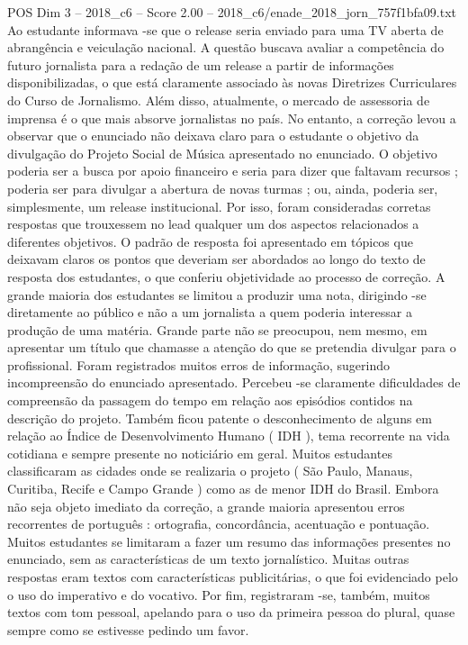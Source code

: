 \begin{textsample}{POS Dim 3 – 2018\_c6 – Score 2.00 – 2018\_c6/enade\_2018\_jorn\_757f1bfa09.txt}
Ao estudante informava -se que o release seria enviado para uma TV aberta de abrangência e veiculação nacional.
A questão buscava avaliar a competência do futuro jornalista para a redação de um release a partir de informações disponibilizadas, o que está claramente associado às novas Diretrizes Curriculares do Curso de Jornalismo.
Além disso, atualmente, o mercado de assessoria de imprensa é o que mais absorve jornalistas no país.
No entanto, a correção levou a observar que o enunciado não deixava claro para o estudante o objetivo da divulgação do Projeto Social de Música apresentado no enunciado.
O objetivo poderia ser a busca por apoio financeiro e seria para dizer que faltavam recursos ; poderia ser para divulgar a abertura de novas turmas ; ou, ainda, poderia ser, simplesmente, um release institucional.
Por isso, foram consideradas corretas respostas que trouxessem no lead qualquer um dos aspectos relacionados a diferentes objetivos.
O padrão de resposta foi apresentado em tópicos que deixavam claros os pontos que deveriam ser abordados ao longo do texto de resposta dos estudantes, o que conferiu objetividade ao processo de correção.
A grande maioria dos estudantes se limitou a produzir uma nota, dirigindo -se diretamente ao público e não a um jornalista a quem poderia interessar a produção de uma matéria.
Grande parte não se preocupou, nem mesmo, em apresentar um título que chamasse a atenção do que se pretendia divulgar para o profissional.
Foram registrados muitos erros de informação, sugerindo incompreensão do enunciado apresentado.
Percebeu -se claramente dificuldades de compreensão da passagem do tempo em relação aos episódios contidos na descrição do projeto.
Também ficou patente o desconhecimento de alguns em relação ao Índice de Desenvolvimento Humano ( IDH ), tema recorrente na vida cotidiana e sempre presente no noticiário em geral.
Muitos estudantes classificaram as cidades onde se realizaria o projeto ( São Paulo, Manaus, Curitiba, Recife e Campo Grande ) como as de menor IDH do Brasil.
Embora não seja objeto imediato da correção, a grande maioria apresentou erros recorrentes de português : ortografia, concordância, acentuação e pontuação.
Muitos estudantes se limitaram a fazer um resumo das informações presentes no enunciado, sem as características de um texto jornalístico.
Muitas outras respostas eram textos com características publicitárias, o que foi evidenciado pelo o uso do imperativo e do vocativo.
Por fim, registraram -se, também, muitos textos com tom pessoal, apelando para o uso da primeira pessoa do plural, quase sempre como se estivesse pedindo um favor.

\end{textsample}
